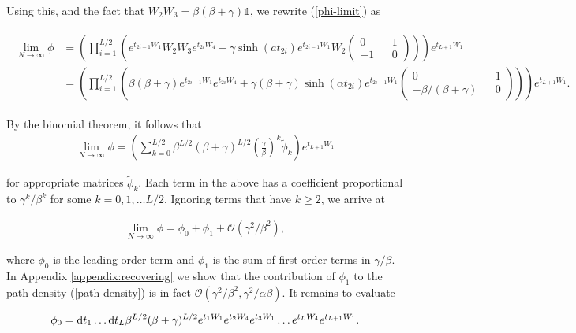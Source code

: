 Using this, and the fact that $W_2W_3 = \beta(\beta +\gamma)\mathds{1}$, we rewrite (\ref{phi-limit}) as 

\begin{align}\label{limit-phi-prod}
\begin{split}
\lim_{N\rightarrow \infty}\phi &= \left(\prod_{i=1}^{L/2}\left(e^{t_{2i-1} W_1} W_2 W_3
    e^{t_{2i} W_4} + \gamma\sinh(at_{2i}) e^{t_{2i-1} W_1} W_2\begin{pmatrix} 0 && 1 \\ -1 && 0 \end{pmatrix} \right)\right)e^{t_{L+1} W_1} \\
    &=  \left(\prod_{i=1}^{L/2}\left(\beta(\beta+\gamma)e^{t_{2i-1} W_1}e^{t_{2i} W_4} + \gamma(\beta+\gamma) \sinh(\alpha t_{2i})e^{t_{2i-1} W_1}\begin{pmatrix} 0 && 1 \\ -\beta/(\beta+\gamma) && 0 \end{pmatrix} \right)\right)e^{t_{L+1} W_1}.
\end{split}
\end{align}

By the binomial theorem, it follows that
\begin{align}
\lim_{N\rightarrow \infty}\phi = \left(\sum_{k=0}^{L/2} \beta^{L/2}(\beta +\gamma)^{L/2}\left(\frac{\gamma}{\beta}\right)^k\tilde{\phi}_k\right) e^{t_{L+1} W_1}
\end{align}

for appropriate matrices $\tilde{\phi}_k$. Each term in the above has a  coefficient proportional to $\gamma^k/\beta^k$ for some $k = 0, 1,\ldots L/2 $. Ignoring terms that have $k \geq 2$, we arrive at 

\begin{align} 
\lim_{N\rightarrow \infty}\phi = \phi_0 + \phi_1 + \mathcal{O}(\gamma^2/\beta^2),
\end{align}

where $\phi_0$ is the leading order term and $\phi_1$ is the sum of first order terms in $\gamma/\beta$. In Appendix \ref{appendix:recovering} we show that the contribution of $\phi_1$ to the path density (\ref{path-density}) is in fact $\mathcal{O}(\gamma^2/\beta^2, \gamma^2/\alpha\beta)$. It remains to evaluate

\begin{align}
\phi_0 = \mathrm{d} t_1 \ldots \mathrm{d} t_L \beta^{L/2}(\beta + \gamma)^{L/2}e^{t_1 W_1}e^{t_2 W_4}e^{t_3 W_1}\ldots e^{t_L W_4}e^{t_{L+1} W_1}.
\end{align}

